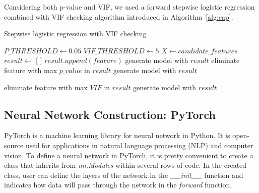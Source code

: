 \documentclass[final-report]{report-template}
\begin{document}
Considering both p-value and VIF, we used a forward stepwise logistic regression combined with VIF checking algorithm introduced in Algorithm~\ref{alg:cap}.

\begin{algorithm}
    \caption{Stepwise logistic regression with VIF checking}\label{alg:cap}
    \begin{algorithmic}
    \State $P\_THRESHOLD \gets 0.05$
    \State $VIF\_THRESHOLD \gets 5$
    \State $X \gets candidate\_features$
    \State $result \gets$ [ ]
    \State $result.append(feature)$
    \State generate model with $result$
    \State eliminate feature with max $p\_value$ in $result$
    \State generate model with $result$
    \EndWhile

    \State eliminate feature with max $VIF$ in $result$
    \State generate model with $result$
    \EndWhile
    \EndFor
    \EndProcedure
    \end{algorithmic}
    \end{algorithm}


\subsection{Neural Network Construction: PyTorch} 

PyTorch \citep{PyTorch} is a machine learning library for neural network in Python. 
It is open-source used for applications in natural language processing (NLP) and computer vision.
To define a neural network in PyTorch, it is pretty convenient to create a class that inherits from \textit{nn.Modules} within several rows of code. 
In the created class, user can define the layers of the network in the \textit{\_\_init\_\_} function and indicates how data will pass through the network in the \textit{forward} function. 
\end{document}
